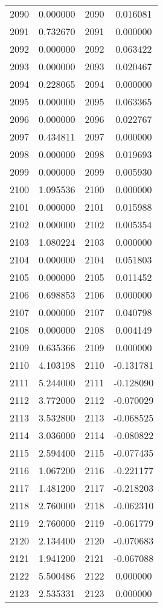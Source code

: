 \documentclass[12pt]{article}
\begin{document}
\begin{longtable}{@{}cccc@{}}
2090 & 0.000000 & 2090 & 0.016081 \\
2091 & 0.732670 & 2091 & 0.000000 \\
2092 & 0.000000 & 2092 & 0.063422 \\
2093 & 0.000000 & 2093 & 0.020467 \\
2094 & 0.228065 & 2094 & 0.000000 \\
2095 & 0.000000 & 2095 & 0.063365 \\
2096 & 0.000000 & 2096 & 0.022767 \\
2097 & 0.434811 & 2097 & 0.000000 \\
2098 & 0.000000 & 2098 & 0.019693 \\
2099 & 0.000000 & 2099 & 0.005930 \\
2100 & 1.095536 & 2100 & 0.000000 \\
2101 & 0.000000 & 2101 & 0.015988 \\
2102 & 0.000000 & 2102 & 0.005354 \\
2103 & 1.080224 & 2103 & 0.000000 \\
2104 & 0.000000 & 2104 & 0.051803 \\
2105 & 0.000000 & 2105 & 0.011452 \\
2106 & 0.698853 & 2106 & 0.000000 \\
2107 & 0.000000 & 2107 & 0.040798 \\
2108 & 0.000000 & 2108 & 0.004149 \\
2109 & 0.635366 & 2109 & 0.000000 \\
2110 & 4.103198 & 2110 & -0.131781 \\
2111 & 5.244000 & 2111 & -0.128090 \\
2112 & 3.772000 & 2112 & -0.070029 \\
2113 & 3.532800 & 2113 & -0.068525 \\
2114 & 3.036000 & 2114 & -0.080822 \\
2115 & 2.594400 & 2115 & -0.077435 \\
2116 & 1.067200 & 2116 & -0.221177 \\
2117 & 1.481200 & 2117 & -0.218203 \\
2118 & 2.760000 & 2118 & -0.062310 \\
2119 & 2.760000 & 2119 & -0.061779 \\
2120 & 2.134400 & 2120 & -0.070683 \\
2121 & 1.941200 & 2121 & -0.067088 \\
2122 & 5.500486 & 2122 & 0.000000 \\
2123 & 2.535331 & 2123 & 0.000000 \\

\end{longtable}
\end{document}
